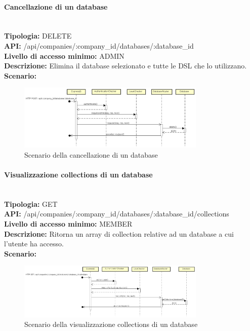 \newpage
\paragraph{Cancellazione di un database}\mbox{}\\
\textbf{Tipologia:} DELETE \\
\textbf{API:} /api/companies/:company\_id/databases/:database\_id \\
\textbf{Livello di accesso minimo:} ADMIN \\
\textbf{Descrizione:} Elimina il database selezionato e tutte le DSL che lo utilizzano. \\
\textbf{Scenario:} 
\begin{figure}[H]
\centering
\includegraphics[width=0.8\textwidth]{res/sections/backend/sequence/(DELETE)database.png}
\caption{Scenario della cancellazione di un database}
\end{figure}

\newpage
\paragraph{Visualizzazione collections di un database} \mbox{}\\
\textbf{Tipologia:} GET \\
\textbf{API:} /api/companies/:company\_id/databases/:database\_id/collections \\
\textbf{Livello di accesso minimo:} MEMBER \\
\textbf{Descrizione:} Ritorna un array di collection relative ad un database a cui l'utente ha accesso. \\
\textbf{Scenario:} 
\begin{figure}[H]
\centering
\includegraphics[width=0.8\textwidth]{res/sections/backend/sequence/(GET)collection.png}
\caption{Scenario della visualizzazione collections di un database}
\end{figure}

